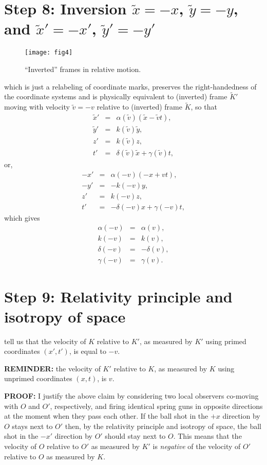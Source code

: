 \documentclass[twocolumn,preprintnumbers,amsmath,amssymb,final]{revtex4}
\def\BEqA{\begin{eqnarray}}
\def\EEqA{\end{eqnarray}}
\def\a{\alpha}
\def\d{\delta}
\def\g{\gamma}
\begin{document}
\section*{Step 8: Inversion $\tilde{x} = -x$, $\tilde{y} = -y$, and 
$\tilde{x}' = -x'$, $\tilde{y}' = -y'$ }

\begin{figure}[!ht]
\texttt{[image: fig4]}
\caption{ \label{fig:4} 
``Inverted'' frames in relative motion.
}
\end{figure}
 
\noindent  which is just a relabeling of coordinate marks, 
preserves the right-handedness of the coordinate 
systems and is physically equivalent to 
(inverted) frame $\tilde{K}'$ moving with velocity 
$\tilde{v} = -v$
relative to (inverted) frame $\tilde{K}$, so that
\BEqA
\tilde{x}'&=&\a(\tilde{v})(\tilde{x} - \tilde{v}t),
\\
\tilde{y}'&=&k(\tilde{v})\tilde{y},
\\
z'&=&k(\tilde{v})z,
\\
t'&=&\d(\tilde{v})\tilde{x}+\g(\tilde{v})t,
\EEqA
or,
\BEqA
-{x}'&=&\a(-v)(-{x} + vt),
\\
-{y}'&=&-k(-v){y},
\\
z'&=&k(-v)z,
\\
t'&=&-\d(-v){x}+\g(-v)t,
\EEqA
which gives
\BEqA
\a(-v)&=&\a(v),
\\
k(-v)&=&k(v),
\\
\d(-v)&=&-\d(v),
\\
\g(-v)&=&\g(v).
\EEqA

\section*{Step 9: Relativity principle and isotropy of space}
 
\noindent  tell us that 
the velocity of $K$ relative to ${K}'$, as measured by $K'$ using
primed coordinates $(x',t')$, is equal to $-v$. 

\vskip10pt

{\bf REMINDER:} the velocity of $K'$ relative to ${K}$,
as measured by $K$ using unprimed coordinates $(x,t)$, is $v$.

\vskip10pt

{\bf PROOF:} I justify the above claim by considering two local observers co-moving with $O$ and $O'$, respectively, and 
firing identical spring guns in opposite directions at the moment when they pass each other. If the ball shot in the $+x$ direction by $O$ 
stays next to $O'$ then, by the relativity principle and isotropy of space, the ball shot in the $-x'$ 
direction by $O'$ should stay next to $O$. 
This means that the velocity of $O$ relative to $O'$ as 
measured by $K'$ is {\it negative} of the velocity of $O'$ relative to $O$ as measured by $K$.
\end{document}
